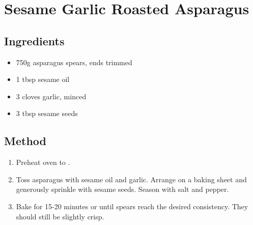 \clearpage
\section{Sesame Garlic Roasted Asparagus}

\begin{multicols}{2}
  \subsection{Ingredients}
    \begin{itemize}
      \item 750g asparagus spears, ends trimmed
      \item 1 tbsp sesame oil
      \item 3 cloves garlic, minced
      \item 3 tbsp sesame seeds
    \end{itemize}
  \vfill\null
  \columnbreak
  \subsection{Method}
    \begin{enumerate}
      \item Preheat oven to .
      \item Toss asparagus with sesame oil and garlic. Arrange on a baking sheet and generously sprinkle with sesame seeds. Season with salt and pepper.
      \item Bake for 15-20 minutes or until spears reach the desired consistency. They should still be slightly crisp.
    \end{enumerate}
  \end{multicols}
